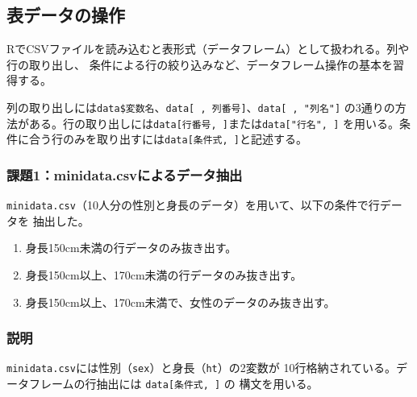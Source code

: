 \documentclass[12pt,a4paper]{ltjsarticle}
\begin{document}
\clearpage

\subsection{表データの操作}\label{sec:table}

RでCSVファイルを読み込むと表形式（データフレーム）として扱われる。列や行の取り出し、
条件による行の絞り込みなど、データフレーム操作の基本を習得する。

列の取り出しには\texttt{data\$変数名}、\texttt{data[ , 列番号]}、\texttt{data[ , "列名"]}
の3通りの方法がある。行の取り出しには\texttt{data[行番号, ]}または\texttt{data["行名", ]}
を用いる。条件に合う行のみを取り出すには\texttt{data[条件式, ]}と記述する。

\subsubsection{課題1：minidata.csvによるデータ抽出}\label{sec:table-task1}

\texttt{minidata.csv}（10人分の性別と身長のデータ）を用いて、以下の条件で行データを
抽出した。

\begin{enumerate}[nosep, label=(\arabic*)]
    \item 身長150cm未満の行データのみ抜き出す。
    \item 身長150cm以上、170cm未満の行データのみ抜き出す。
    \item 身長150cm以上、170cm未満で、女性のデータのみ抜き出す。
\end{enumerate}





\subsubsection*{説明}
\texttt{minidata.csv}には性別（\texttt{sex}）と身長（\texttt{ht}）の2変数が
10行格納されている。データフレームの行抽出には \texttt{data[条件式, ]} の
構文を用いる。
\end{document}
